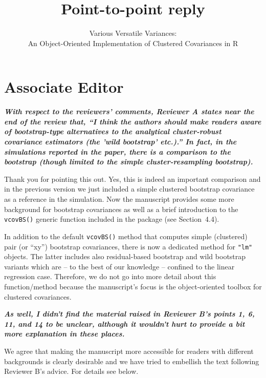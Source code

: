 \documentclass[10pt,a4paper]{article}
\begin{document}
\title{Point-to-point reply}
\author{Various Versatile Variances:\\ An Object-Oriented Implementation of Clustered Covariances in R}
\date{}
\maketitle

\section*{Associate Editor}

\textbf{\textit{With respect to the reviewers' comments, Reviewer A states near the end of
the review that, ``I think the authors should make readers aware of
bootstrap-type alternatives to the analytical cluster-robust covariance
estimators (the 'wild bootstrap' etc.).'' In fact, in the simulations
reported in the paper, there is a comparison to the bootstrap (though
limited to the simple cluster-resampling bootstrap).}}

\medskip

Thank you for pointing this out. Yes, this is indeed an important comparison and
in the previous version we just included a simple clustered bootstrap covariance
as a reference in the simulation. Now the manuscript provides some more background
for bootstrap covariances as well as a brief introduction to the \texttt{vcovBS()}
generic function included in the package (see Section~4.4).

In addition to the default \texttt{vcovBS()} method that computes simple (clustered)
pair (or ``xy'') bootstrap covariances, there is now a dedicated method for \texttt{"lm"}
objects. The latter includes also residual-based bootstrap and wild bootstrap variants
which are -- to the best of our knowledge -- confined to the linear regression case.
Therefore, we do not go into more detail about this function/method because the manuscript's
focus is the object-oriented toolbox for clustered covariances.

\medskip

\textbf{\textit{As well, I didn't find the material raised in Reviewer B's points 1, 6, 11,
and 14 to be unclear, although it wouldn't hurt to provide a bit more
explanation in these places.}}

\medskip

We agree that making the manuscript more accessible for readers with different backgrounds is
clearly desirable and we have tried to embellish the text following Reviewer B's advice.
For details see below.
\end{document}
